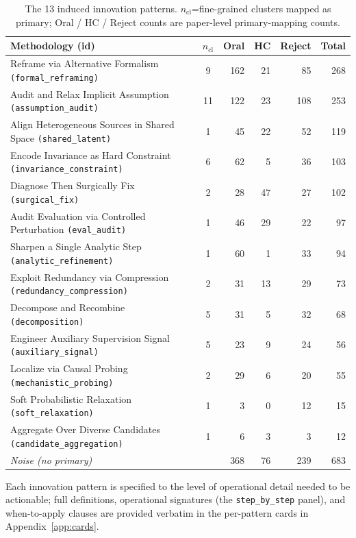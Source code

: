\documentclass[10pt,a4paper]{article}
\begin{document}
\begin{table}[htbp]
\centering
\caption{The 13 induced innovation patterns. \(n_\text{cl}\)=fine-grained clusters mapped as primary; Oral / HC / Reject counts are paper-level primary-mapping counts.}
\label{tab:tax}
\small
\begin{tabular}{p{7cm} c rrrr}
\toprule
\textbf{Methodology (id)} & \textbf{\(n_\text{cl}\)} & \textbf{Oral} & \textbf{HC} & \textbf{Reject} & \textbf{Total} \\
\midrule
Reframe via Alternative Formalism \texttt{(formal\_reframing)}      & 9 & 162 & 21 & 85 & 268 \\
Audit and Relax Implicit Assumption \texttt{(assumption\_audit)}    & 11 & 122 & 23 & 108 & 253 \\
Align Heterogeneous Sources in Shared Space \texttt{(shared\_latent)} & 1 & 45 & 22 & 52 & 119 \\
Encode Invariance as Hard Constraint \texttt{(invariance\_constraint)} & 6 & 62 & 5 & 36 & 103 \\
Diagnose Then Surgically Fix \texttt{(surgical\_fix)}               & 2 & 28 & 47 & 27 & 102 \\
Audit Evaluation via Controlled Perturbation \texttt{(eval\_audit)} & 1 & 46 & 29 & 22 & 97 \\
Sharpen a Single Analytic Step \texttt{(analytic\_refinement)}      & 1 & 60 & 1 & 33 & 94 \\
Exploit Redundancy via Compression \texttt{(redundancy\_compression)} & 2 & 31 & 13 & 29 & 73 \\
Decompose and Recombine \texttt{(decomposition)}                    & 5 & 31 & 5 & 32 & 68 \\
Engineer Auxiliary Supervision Signal \texttt{(auxiliary\_signal)}  & 5 & 23 & 9 & 24 & 56 \\
Localize via Causal Probing \texttt{(mechanistic\_probing)}         & 2 & 29 & 6 & 20 & 55 \\
Soft Probabilistic Relaxation \texttt{(soft\_relaxation)}           & 1 & 3 & 0 & 12 & 15 \\
Aggregate Over Diverse Candidates \texttt{(candidate\_aggregation)} & 1 & 6 & 3 & 3 & 12 \\
\midrule
\textit{Noise (no primary)} &  & 368 & 76 & 239 & 683 \\
\bottomrule
\end{tabular}
\end{table}

Each innovation pattern is specified to the level of operational detail needed to be actionable; full definitions, operational signatures (the \texttt{step\_by\_step} panel), and when-to-apply clauses are provided verbatim in the per-pattern cards in Appendix~\ref{app:cards}.
\end{document}
